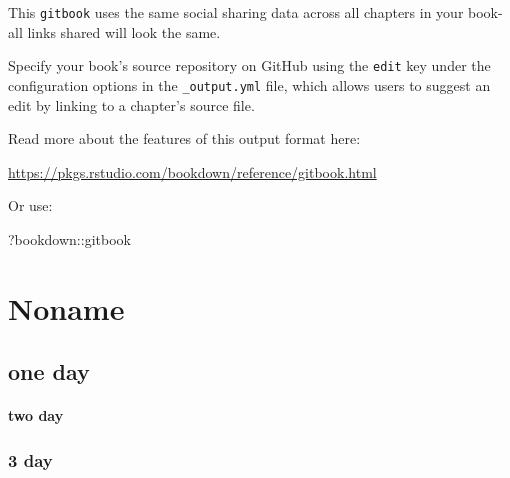 \documentclass[
]{book}
\newenvironment{Shaded}{\begin{snugshade}}{\end{snugshade}}
\newcommand{\NormalTok}[1]{#1}
\newcommand{\SpecialCharTok}[1]{\textcolor[rgb]{0.00,0.00,0.00}{#1}}
\theoremstyle{definition}
\theoremstyle{definition}
\theoremstyle{definition}
\theoremstyle{definition}
\theoremstyle{remark}
\begin{document}
This \texttt{gitbook} uses the same social sharing data across all chapters in your book- all links shared will look the same.

Specify your book's source repository on GitHub using the \texttt{edit} key under the configuration options in the \texttt{\_output.yml} file, which allows users to suggest an edit by linking to a chapter's source file.

Read more about the features of this output format here:

\url{https://pkgs.rstudio.com/bookdown/reference/gitbook.html}

Or use:

\begin{Shaded}
\begin{Highlighting}[]
\NormalTok{?bookdown}\SpecialCharTok{::}\NormalTok{gitbook}
\end{Highlighting}
\end{Shaded}

\hypertarget{noname}{%
\chapter*{Noname}\label{noname}}

\hypertarget{one-day}{%
\section{one day}\label{one-day}}

\hypertarget{two-day}{%
\subsubsection*{two day}\label{two-day}}

\hypertarget{day}{%
\subsection{3 day}\label{day}}
\end{document}
